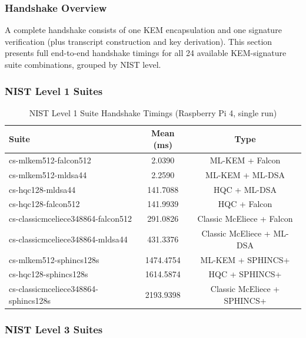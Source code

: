 \documentclass[conference]{IEEEtran}
\begin{document}
\subsubsection{Handshake Overview}

A complete handshake consists of one KEM encapsulation and one signature verification (plus transcript construction and key derivation). This section presents full end-to-end handshake timings for all 24 available KEM-signature suite combinations, grouped by NIST level.

\subsubsection{NIST Level 1 Suites}

\begin{table}[htbp]
\centering
\caption{NIST Level 1 Suite Handshake Timings (Raspberry Pi 4, single run)}
\begin{tabular}{lcc}
\toprule
\textbf{Suite} & \textbf{Mean (ms)} & \textbf{Type} \\
\midrule
cs-mlkem512-falcon512 & 2.0390 & ML-KEM + Falcon \\
cs-mlkem512-mldsa44 & 2.2590 & ML-KEM + ML-DSA \\
cs-hqc128-mldsa44 & 141.7088 & HQC + ML-DSA \\
cs-hqc128-falcon512 & 141.9939 & HQC + Falcon \\
cs-classicmceliece348864-falcon512 & 291.0826 & Classic McEliece + Falcon \\
cs-classicmceliece348864-mldsa44 & 431.3376 & Classic McEliece + ML-DSA \\
cs-mlkem512-sphincs128s & 1474.4754 & ML-KEM + SPHINCS+ \\
cs-hqc128-sphincs128s & 1614.5874 & HQC + SPHINCS+ \\
cs-classicmceliece348864-sphincs128s & 2193.9398 & Classic McEliece + SPHINCS+ \\
\bottomrule
\end{tabular}
\end{table}

\subsubsection{NIST Level 3 Suites}
\end{document}
